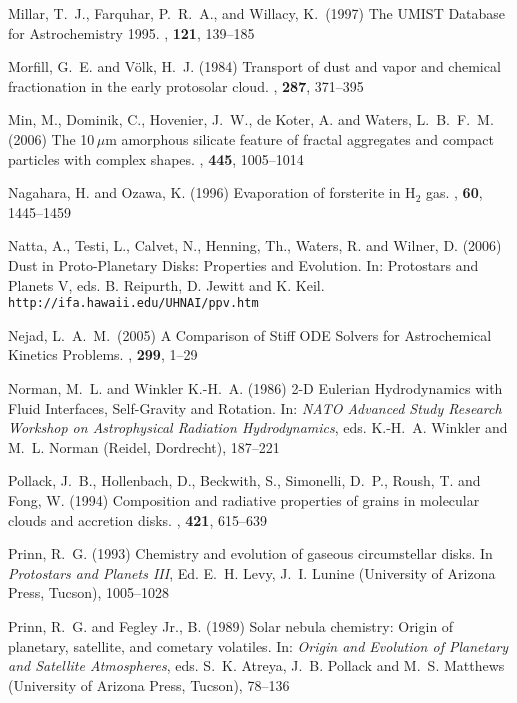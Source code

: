 \begin{literature}
\item
Millar, T.~J., Farquhar, P.~R.~A., and Willacy, K.\ (1997) The UMIST Database
for Astrochemistry 1995. \aaps, \textbf{121}, 139--185

\item
Morfill, G.~E. and V\"olk, H.~J. (1984) Transport of dust and vapor and chemical
fractionation in the early protosolar cloud.  \apj, \textbf{287}, 371--395

\item
Min, M., Dominik, C., Hovenier, J.~W., de Koter, A. and Waters,
L.~B.~F.~M. (2006) The 10\,$\mu$m amorphous silicate feature of fractal
aggregates and compact particles with complex shapes. \aap, \textbf{445},
1005--1014

\item
Nagahara, H. and Ozawa,  K. (1996) Evaporation of forsterite in H$_2$ gas.
\gca, \textbf{60}, 1445--1459

\item
Natta, A., Testi, L., Calvet, N., Henning, Th., Waters, R. and Wilner, D. (2006)
Dust in Proto-Planetary Disks: Properties and Evolution. In: Protostars and
Planets V, eds. B. Reipurth, D. Jewitt and K. Keil.\\ 
  {\tt http://ifa.hawaii.edu/UHNAI/ppv.htm}

\item
Nejad, L.~A.~M.\ (2005) A Comparison of Stiff ODE Solvers for Astrochemical
Kinetics Problems. \apss, \textbf{299}, 1--29

\item
Norman, M.~L. and Winkler K.-H.~A. (1986) 2-D Eulerian Hydrodynamics with Fluid
Interfaces, Self-Gravity and Rotation. In: \textit{NATO Advanced Study Research Workshop on Astrophysical Radiation Hydrodynamics}, eds.  K.-H.~A. Winkler and
M.~L. Norman (Reidel, Dordrecht), 187--221

\item
Pollack, J.~B., Hollenbach, D., Beckwith, S., Simonelli, D.~P., Roush, T.
and Fong, W. (1994) Composition and radiative properties of grains in molecular
clouds and accretion disks. \apj, \textbf{421}, 615--639

\item
Prinn, R.~G. (1993) Chemistry and evolution of gaseous circumstellar
disks. In \textit{Protostars and Planets III}, Ed. E.~H. Levy, J.~I. Lunine
(University of Arizona Press, Tucson), 1005--1028

\item
Prinn, R.~G. and Fegley Jr., B. (1989) Solar nebula chemistry: Origin of
planetary, satellite, and cometary volatiles. In: \textit{Origin and Evolution
of Planetary and Satellite Atmospheres}, eds. S.~K. Atreya, J.~B. Pollack and
M.~S. Matthews (University of Arizona Press, Tucson),  78--136


\end{literature}
